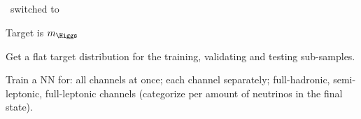\begin{frame}
\manip \GeV\ switched to \TeV

\manip Target is $m_{\Higgs}$

\manip Get a flat target distribution for the training, validating and testing sub-samples.

\manip Train a NN for:
\submanip all channels at once;
\submanip each channel separately;
\submanip full-hadronic, semi-leptonic, full-leptonic channels (categorize per amount of neutrinos in the final state).
\end{frame}